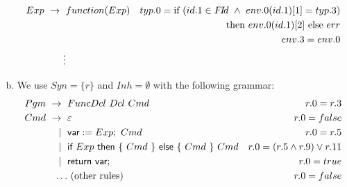 \begin{solution}
\begin{enumerate}[(a)]
\begin{align*}
Exp  ~{}\rightarrow~{} & function(Exp) &   typ.0 = \text{if}~ (id.1 \in \FId ~\wedge~env.0(id.1)[1]=typ.3)  \\
&& \quad \text{then}~env.0(id.1)[2]~\text{else}~ err\\ 
&& \quad env.3 = env.0\\
%
\vdots&
%
\end{align*}
%
%
%
\item We use $Syn=\{r\}$ and $Inh=\emptyset$ with the following grammar:
\begin{align*}
	     Pgm  ~{}\rightarrow {}~& FuncDcl~Dcl~Cmd                                                    & r.0=r.3 \\
	      Cmd  ~{}\rightarrow~{} & \varepsilon                                                          & r.0=false\\
	      ~{}\mid{}~& \textsf{var} := Exp;~ Cmd                                                      & r.0=r.5\\
	      ~{}\mid{}~& \textsf{if}~ Exp~ \textsf{then}~ \{~ Cmd~ \}~ \textsf{else}~ \{~ Cmd~ \}~ Cmd  & r.0=(r.5 \land r.9) \lor r.11\\
	      ~{}\mid{}~& \textsf{return}~\textsf{var};                                                             & r.0=true\\
	      \ldots&~ \text{(other rules)}                                                              & r.0=false
	\end{align*}
\end{enumerate}
\end{solution}
